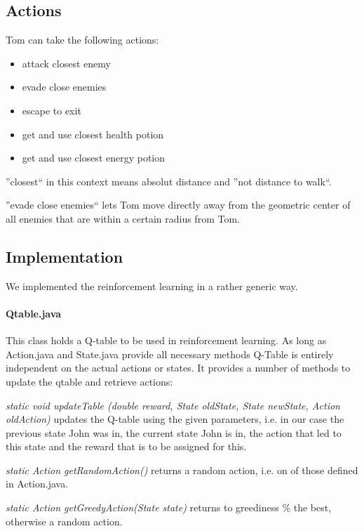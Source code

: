 \documentclass[a4paper,10pt]{scrartcl}
\begin{document}
\subsection{Actions}
Tom can take the following actions:
\begin{itemize}
 \item attack closest enemy
 \item evade close enemies
 \item escape to exit
 \item get and use closest health potion
 \item get and use closest energy potion
\end{itemize}

''closest`` in this context means absolut distance and ''not distance to walk``. \par

''evade close enemies`` lets Tom move directly away from the geometric center of all enemies that are within a certain radius from Tom.

\subsection{Implementation}
We implemented the reinforcement learning in a rather generic way. \par

\paragraph{Qtable.java}
This class holds a Q-table to be used in reinforcement learning. As long as Action.java and State.java provide all necessary methods Q-Table is entirely independent on the actual actions or states. It provides a number of methods to update the qtable and retrieve actions: \par

\textit{static void updateTable (double reward, State oldState, State newState, Action oldAction)} updates the Q-table using the given parameters, i.e. in our case the previous state John was in, the current state John is in, the action that led to this state and the reward that is to be assigned for this. \par

\textit{static Action getRandomAction()} returns a random action, i.e. on of those defined in Action.java. \par

\textit{static Action getGreedyAction(State state)} returns to  greediness \% the best, otherwise a random action. \par
\end{document}
